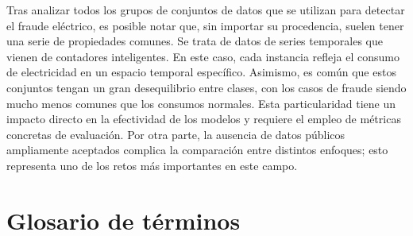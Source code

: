 \documentclass[12pt,a4paper]{report}
\begin{document}
Tras analizar todos los grupos de conjuntos de datos que se utilizan para detectar el fraude eléctrico, es posible notar que, sin importar su procedencia, suelen tener una serie de propiedades comunes. Se trata de datos de series temporales que vienen de contadores inteligentes. En este caso, cada instancia refleja el consumo de electricidad en un espacio temporal específico. Asimismo, es común que estos conjuntos tengan un gran desequilibrio entre clases, con los casos de fraude siendo mucho menos comunes que los consumos normales. Esta particularidad tiene un impacto directo en la efectividad de los modelos y requiere el empleo de métricas concretas de evaluación. Por otra parte, la ausencia de datos públicos ampliamente aceptados complica la comparación entre distintos enfoques; esto representa uno de los retos más importantes en este campo.


\section{Glosario de términos}

\label{sec:glosario}
\end{document}
